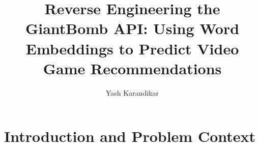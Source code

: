 \documentclass[10pt,twocolumn]{article}
\title{Reverse Engineering the GiantBomb API: Using Word Embeddings to Predict Video Game Recommendations}
\author{Yash Karandikar}
\affiliation{Occidental College}
\begin{document}
\maketitle

 
\section{Introduction and Problem Context}



        

\end{document}
